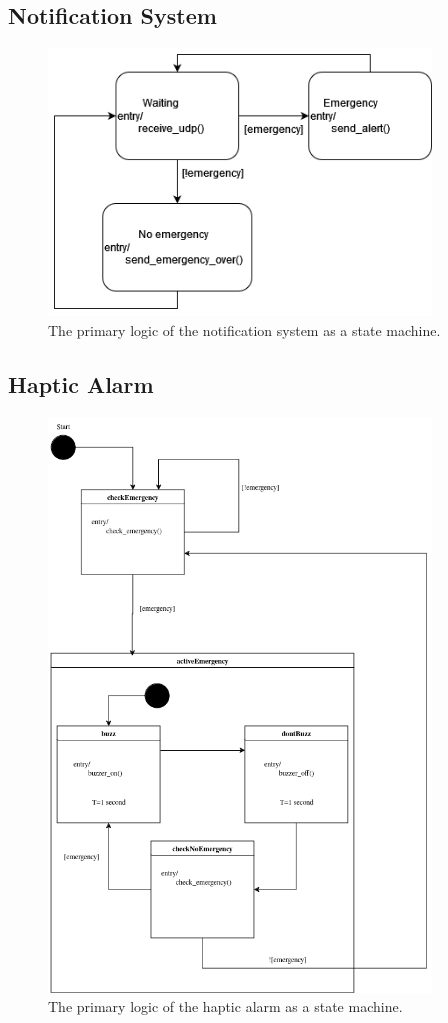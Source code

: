 \subsection{Notification System}

\begin{figure}[H]
    \centering
    \includegraphics[width=4in]{../assets/state-machine/NotificationSystemStateMachine.png}
    \caption{The primary logic of the notification system as a state machine.}
\end{figure}

\subsection{Haptic Alarm}

\begin{figure}[H]
    \centering
    \includegraphics[width=4in]{../assets/state-machine/HapticAlarmStateMachine.png}
    \caption{The primary logic of the haptic alarm as a state machine.}
\end{figure}

